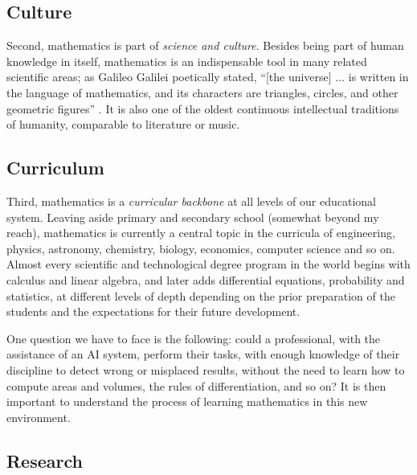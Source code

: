 \documentclass[12pt]{article}
\begin{document}
\subsection{Culture}

Second, mathematics is part of \emph{science and culture}.
Besides being part of human knowledge in itself, mathematics is an
indispensable tool in many related scientific areas; as Galileo Galilei poetically stated,
``[the universe] $\dots$ is written in the language of mathematics, and its characters are triangles, circles, and other geometric figures'' \cite{wiki3}.
It is also one of the oldest continuous intellectual traditions of humanity, comparable to
literature or music.




\subsection{Curriculum}

Third, mathematics is a \emph{curricular backbone} at all levels of our educational system.
Leaving aside primary and secondary school (somewhat beyond my reach),
mathematics is currently a central topic in the curricula of engineering,
physics, astronomy, chemistry, biology, economics, computer science and so on.
Almost every scientific and technological degree program
in the world begins with calculus and linear algebra, and later adds
differential equations, probability and statistics, at different levels of depth depending
on the prior preparation of the students and the expectations for their future development.

One question we have to face is the following: could a professional, with the
assistance of an AI system, perform their tasks, with enough knowledge of
their discipline to detect wrong or misplaced results, without
the need to learn how to compute areas and volumes,
the rules of differentiation, and so on?
It is then important to understand the process of learning mathematics in this new environment.


\subsection{Research}
\end{document}
